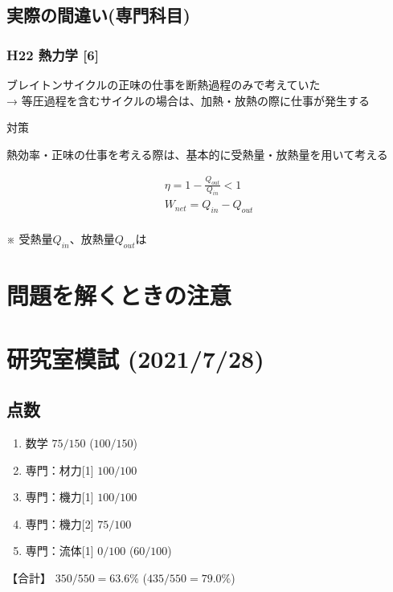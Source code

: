 \documentclass[a4paper]{jsarticle}
\begin{document}
\subsection{実際の間違い(専門科目)}
\subsubsection{H22 熱力学 [6]}
ブレイトンサイクルの正味の仕事を断熱過程のみで考えていた\\
→ 等圧過程を含むサイクルの場合は、加熱・放熱の際に仕事が発生する\\
\begin{itembox}[l]{対策}
    \begin{center}
        熱効率・正味の仕事を考える際は、基本的に受熱量・放熱量を用いて考える
    \end{center}
    \begin{eqnarray*}
        \eta = 1 - \frac{Q_{out}}{Q_{in}} < 1\\
        W_{net} = Q_{in} - Q_{out}\\
    \end{eqnarray*}
    \begin{center}
        ※ 受熱量$Q_{in}$、放熱量$Q_{out}$は
    \end{center}
\end{itembox}
\newpage
\section{問題を解くときの注意}

\newpage
\section{研究室模試 (2021/7/28)}
\subsection{点数}
\begin{enumerate}[(1)]
    \item 数学 \qquad \qquad $75/150$ ($100/150$)
    \item 専門：材力[1] $100/100$
    \item 専門：機力[1] $100/100$
    \item 専門：機力[2] $75/100$
    \item 専門：流体[1] $0/100$ ($60/100$)
\end{enumerate}
【合計】 $350/550 = 63.6 \%$ \quad ($435/550 = 79.0\%$)
\end{document}
